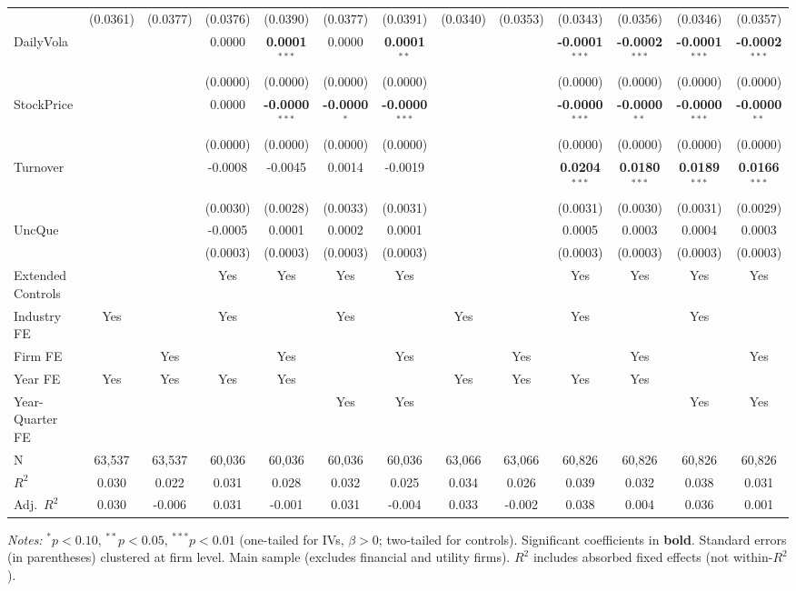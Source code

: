 \begin{landscape}
\begin{table}[H]
\begin{tabular}{lcccccccccccc}
 & (0.0361) & (0.0377) & (0.0376) & (0.0390) & (0.0377) & (0.0391) & (0.0340) & (0.0353) & (0.0343) & (0.0356) & (0.0346) & (0.0357) \\
DailyVola &  &  & 0.0000 & \textbf{0.0001}$^{***}$ & 0.0000 & \textbf{0.0001}$^{**}$ &  &  & \textbf{-0.0001}$^{***}$ & \textbf{-0.0002}$^{***}$ & \textbf{-0.0001}$^{***}$ & \textbf{-0.0002}$^{***}$ \\
 &  &  & (0.0000) & (0.0000) & (0.0000) & (0.0000) &  &  & (0.0000) & (0.0000) & (0.0000) & (0.0000) \\
StockPrice &  &  & 0.0000 & \textbf{-0.0000}$^{***}$ & \textbf{-0.0000}$^{*}$ & \textbf{-0.0000}$^{***}$ &  &  & \textbf{-0.0000}$^{***}$ & \textbf{-0.0000}$^{**}$ & \textbf{-0.0000}$^{***}$ & \textbf{-0.0000}$^{**}$ \\
 &  &  & (0.0000) & (0.0000) & (0.0000) & (0.0000) &  &  & (0.0000) & (0.0000) & (0.0000) & (0.0000) \\
Turnover &  &  & -0.0008 & -0.0045 & 0.0014 & -0.0019 &  &  & \textbf{0.0204}$^{***}$ & \textbf{0.0180}$^{***}$ & \textbf{0.0189}$^{***}$ & \textbf{0.0166}$^{***}$ \\
 &  &  & (0.0030) & (0.0028) & (0.0033) & (0.0031) &  &  & (0.0031) & (0.0030) & (0.0031) & (0.0029) \\
UncQue &  &  & -0.0005 & 0.0001 & 0.0002 & 0.0001 &  &  & 0.0005 & 0.0003 & 0.0004 & 0.0003 \\
 &  &  & (0.0003) & (0.0003) & (0.0003) & (0.0003) &  &  & (0.0003) & (0.0003) & (0.0003) & (0.0003) \\
\midrule
Extended Controls &  &  & Yes & Yes & Yes & Yes &  &  & Yes & Yes & Yes & Yes \\
Industry FE & Yes &  & Yes &  & Yes &  & Yes &  & Yes &  & Yes &  \\
Firm FE &  & Yes &  & Yes &  & Yes &  & Yes &  & Yes &  & Yes \\
Year FE & Yes & Yes & Yes & Yes &  &  & Yes & Yes & Yes & Yes &  &  \\
Year-Quarter FE &  &  &  &  & Yes & Yes &  &  &  &  & Yes & Yes \\
\midrule
N & 63,537 & 63,537 & 60,036 & 60,036 & 60,036 & 60,036 & 63,066 & 63,066 & 60,826 & 60,826 & 60,826 & 60,826 \\
$R^2$ & 0.030 & 0.022 & 0.031 & 0.028 & 0.032 & 0.025 & 0.034 & 0.026 & 0.039 & 0.032 & 0.038 & 0.031 \\
Adj.~$R^2$ & 0.030 & -0.006 & 0.031 & -0.001 & 0.031 & -0.004 & 0.033 & -0.002 & 0.038 & 0.004 & 0.036 & 0.001 \\
\bottomrule
\end{tabular}
\begin{minipage}{\linewidth}
\vspace{2pt}\scriptsize
\textit{Notes:} $^{*}p<0.10$, $^{**}p<0.05$, $^{***}p<0.01$ (one-tailed for IVs, $\beta > 0$; two-tailed for controls).
 Significant coefficients in \textbf{bold}.
 Standard errors (in parentheses) clustered at firm level.
 Main sample (excludes financial and utility firms).
 $R^2$ includes absorbed fixed effects (not within-$R^2$).
\end{minipage}
\end{table}
\end{landscape}